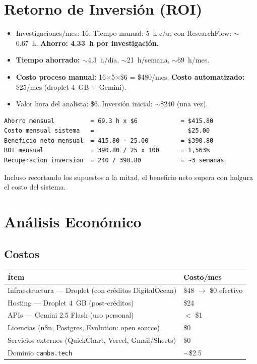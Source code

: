 \documentclass[11pt,a4paper]{article}
\newcommand{\code}[1]{\texttt{\small #1}}
\begin{document}
\section{Retorno de Inversión (ROI)}
\label{sec:roi}
\begin{itemize}[leftmargin=1.4em]
\item Investigaciones/mes: 16. Tiempo manual: 5~h c/u; con ResearchFlow: $\sim$0.67~h. \textbf{Ahorro: 4.33~h por investigación.}
\item \textbf{Tiempo ahorrado:} $\sim$4.3~h/día, $\sim$21~h/semana, $\sim$69~h/mes.
\item \textbf{Costo proceso manual:} 16$\times$5$\times$\$6 = \$480/mes. \textbf{Costo automatizado:} \$25/mes (droplet 4~GB + Gemini).
\item Valor hora del analista: \$6. Inversión inicial: $\sim$\$240 (una vez).
\end{itemize}
\begin{lstlisting}
Ahorro mensual          = 69.3 h x $6            = $415.80
Costo mensual sistema   =                          $25.00
Beneficio neto mensual  = 415.80 - 25.00         = $390.80
ROI mensual             = 390.80 / 25 x 100      = 1,563%
Recuperacion inversion  = 240 / 390.80           = ~3 semanas
\end{lstlisting}
Incluso recortando los supuestos a la mitad, el beneficio neto supera con holgura el costo del sistema.

\section{Análisis Económico}
\label{sec:econ}
\subsection{Costos}
\renewcommand{\arraystretch}{1.2}
\begin{longtable}{L{10.5cm} L{4cm}}
\toprule \textbf{Ítem} & \textbf{Costo/mes}\\ \midrule \endhead
Infraestructura --- Droplet (con créditos DigitalOcean) & \$48 $\rightarrow$ \$0 efectivo\\
Hosting --- Droplet 4~GB (post-créditos) & \$24\\
APIs --- Gemini 2.5 Flash (uso personal) & $<$ \$1\\
Licencias (n8n, Postgres, Evolution: open source) & \$0\\
Servicios externos (QuickChart, Vercel, Gmail/Sheets) & \$0\\
Dominio \code{camba.tech} & $\sim$\$2.5\\
\bottomrule
\end{longtable}
\end{document}
